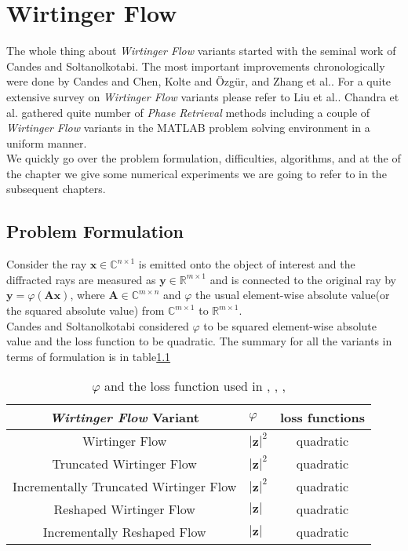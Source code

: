 \chapter{Wirtinger Flow}

The whole thing about \emph{Wirtinger Flow} variants started with the seminal work of Candes and Soltanolkotabi\cite{bib:wf}.
The most important improvements chronologically were done by Candes and Chen\cite{bib:twf}, Kolte and Özgür\cite{bib:itwf}, and Zhang et al.\cite{bib:rfw-irwf}.
For a quite extensive survey on \emph{Wirtinger Flow} variants please refer to Liu et al.\cite{bib:wf-survey}. Chandra et al.\cite{bib:phasepack} 
gathered quite number of \emph{Phase Retrieval} methods including a couple of \emph{Wirtinger Flow} variants in the MATLAB\textregistered\space 
problem solving environment in a uniform manner.\\
We quickly go over the problem formulation, difficulties, algorithms, and at the of the chapter we give some numerical experiments we are going
to refer to in the subsequent chapters.

\section{Problem Formulation}
Consider the ray $\boldsymbol{x} \in \mathbb{C}^{n \times 1}$ is emitted onto the object of interest and the diffracted rays are measured as 
$\boldsymbol{y} \in \mathbb{R}^{m \times 1}$ and is connected to the original ray by $\boldsymbol{y} = \varphi(\boldsymbol{A}\boldsymbol{x})$,
where $\boldsymbol{A} \in \mathbb{C}^{m \times n}$ and $\varphi$ the usual element-wise absolute value(or the squared absolute value) from 
$\mathbb{C}^{m \times 1}$ to $\mathbb{R}^{m \times 1}$.\\
Candes and Soltanolkotabi\cite{bib:wf} considered $\varphi$ to be squared element-wise absolute value and the loss function to be quadratic. 
The summary for all the variants in terms of formulation is in table\ref{tab:formulation}  


\begin{table}
	\centering
	\begin{tabular}{||c l c||} 
	 \hline
	 \emph{Wirtinger Flow} Variant 			& $\varphi$ 						& loss functions\\ [0.5ex] 
	 \hline\hline
	 Wirtinger Flow 			 			& $\left|\boldsymbol{z}\right|^2$ 	& quadratic 	\\ 
	 Truncated Wirtinger Flow   			& $\left|\boldsymbol{z}\right|^2$ 	& quadratic 	\\
	 Incrementally Truncated Wirtinger Flow & $\left|\boldsymbol{z}\right|^2$  	& quadratic 	\\
	 Reshaped Wirtinger Flow 				& $\left|\boldsymbol{z}\right|$ 	& quadratic 	\\
	 Incrementally Reshaped Flow 			& $\left|\boldsymbol{z}\right|$ 	& quadratic 	\\ [1ex] 
	 \hline
	\end{tabular}
	\caption{$\varphi$ and the loss function used in \cite{bib:wf}, \cite{bib:twf}, \cite{bib:itwf}, \cite{bib:rfw-irwf}}
	\label{tab:formulation}
	\end{table}
